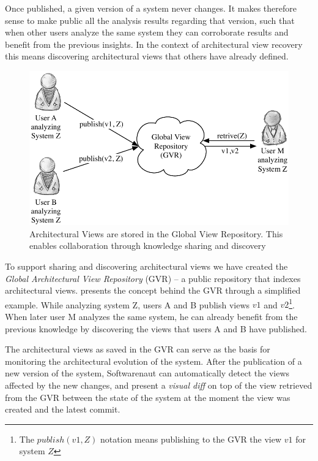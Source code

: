 \documentclass[preprint,12pt]{elsarticle}
\begin{document}
Once published, a given version of a system never changes. It makes therefore sense to make public all the analysis results regarding that version, such that when other users analyze the same system they can corroborate results and benefit from the previous insights. In the context of architectural view recovery this means discovering architectural views that others have already defined. 

\begin{figure}[ht]
\begin{center}
\includegraphics[width=0.7\linewidth]{images/CollaborationConcept}
\caption{Architectural Views are stored in the Global View Repository. This enables collaboration through knowledge sharing and discovery}
\end{center}
\end{figure}


To support sharing and discovering architectural views we have created the {\em Global Architectural View Repository} (GVR) -- a public repository that indexes architectural views.  presents the concept behind the GVR through a simplified example. While analyzing system Z, users A and B publish views $v1$ and $v2$\footnote{The $publish(v1,Z)$ notation means publishing to the GVR the view $v1$ for system $Z$}. When later user M analyzes the same system, he can already benefit from the previous knowledge by discovering the views that users A and B have published. 


The architectural views as saved in the GVR can serve as the basis for monitoring the architectural evolution of the system. After the publication of a new version of the system, Softwarenaut can automatically detect the views affected by the new changes, and present a {\em visual diff} on top of the view retrieved from the GVR between the state of the system at the moment the view was created and the latest commit.
\end{document}
